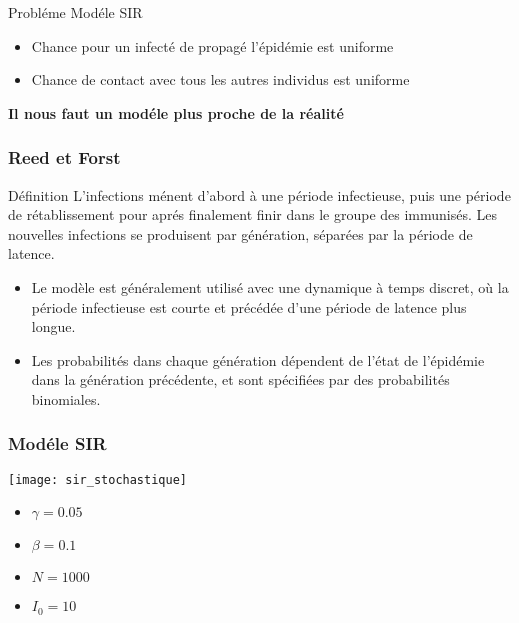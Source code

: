 \begin{frame}
    \begin{block}{Probléme Modéle SIR}
        \begin{itemize}
            \item Chance pour un infecté de propagé l'épidémie est uniforme
            \item Chance de contact avec tous les autres individus est uniforme
        \end{itemize}
    \end{block}

    \begin{center}
        \bf Il nous faut un modéle plus proche de la réalité
    \end{center}
\end{frame}


\begin{frame}
    \frametitle{Reed et Forst}

    \begin{block}{Définition}
        L'infections ménent d'abord à une période infectieuse, puis une période de rétablissement pour aprés finalement finir dans le groupe des immunisés. Les nouvelles infections se produisent par génération, séparées par la période de latence.
    \end{block}

    \begin{itemize}
        \item Le modèle est généralement utilisé avec une dynamique à temps discret, où la période infectieuse est courte et précédée d’une période de latence plus longue.
        \item Les probabilités dans chaque génération dépendent de l’état de l’épidémie dans la génération précédente, et sont spécifiées par des probabilités binomiales.
    \end{itemize}
\end{frame}

\begin{frame}
        \frametitle{Modéle SIR}

        \centering
        \texttt{[image: sir\_stochastique]}

        \begin{itemize}
                \item $\gamma = 0.05$
                \item $\beta = 0.1$
                \item $N = 1000$
                \item $I_0 = 10$
        \end{itemize}

\end{frame}

